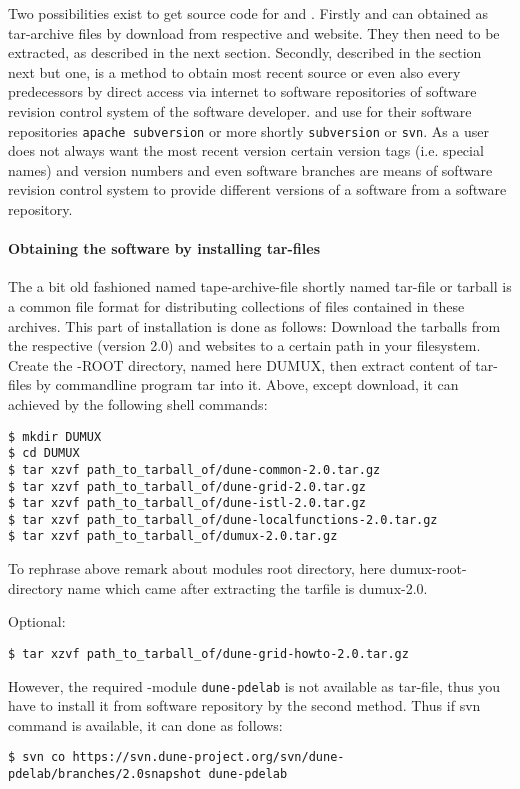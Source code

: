 Two possibilities exist to get source code for \Dune and \Dumux.
Firstly \Dune and \Dumux can obtained as tar-archive files by download from respective {\Dune} and {\Dumux} website. They then need to be extracted, as described in the next section.
Secondly, described in the section next but one, is a method to obtain most recent source or even also every predecessors by direct access via internet to software repositories of software revision control system of the software developer. \Dune and \Dumux use for their software repositories \texttt{apache subversion} or more shortly \texttt{subversion} or \texttt{svn}.
As a user does not always want the most recent version
certain version tags (i.e. special names) and version numbers and even software branches are means of software revision control system to provide different versions of a software from a software repository.

\paragraph{Obtaining the software by installing tar-files}
The a bit old fashioned named tape-archive-file shortly named tar-file or tarball is a common file format for distributing collections of files contained in these archives.
This part of installation is done as follows: 
Download the tarballs from the respective \Dune (version 2.0) and \Dumux websites to a certain path in your filesystem.
Create the {\Dune}-ROOT directory, named here DUMUX, then extract content of tar-files by commandline program tar into it.
Above, except download, it can achieved by the following shell commands:

\begin{lstlisting}[style=Bash]
$ mkdir DUMUX
$ cd DUMUX
$ tar xzvf path_to_tarball_of/dune-common-2.0.tar.gz 
$ tar xzvf path_to_tarball_of/dune-grid-2.0.tar.gz 
$ tar xzvf path_to_tarball_of/dune-istl-2.0.tar.gz 
$ tar xzvf path_to_tarball_of/dune-localfunctions-2.0.tar.gz 
$ tar xzvf path_to_tarball_of/dumux-2.0.tar.gz
\end{lstlisting}

To rephrase above remark about modules root directory, here dumux-root-directory name which came after extracting the tarfile is dumux-2.0.

Optional:
\begin{lstlisting}[style=Bash]
$ tar xzvf path_to_tarball_of/dune-grid-howto-2.0.tar.gz
\end{lstlisting}

However, the required \Dune-module \texttt{dune-pdelab} is not available as tar-file, thus you have to install it from software repository by the second method.  Thus if svn command is available, it can done as follows: 
\begin{lstlisting}[style=Bash]
$ svn co https://svn.dune-project.org/svn/dune-pdelab/branches/2.0snapshot dune-pdelab
\end{lstlisting}

